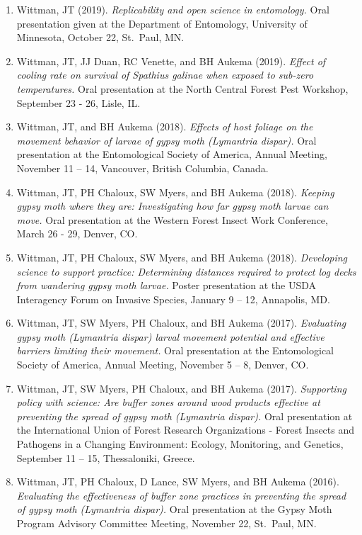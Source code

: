 \documentclass[11pt, a4paper]{awesome-cv}
\providecommand{\tightlist}{%
	\setlength{\itemsep}{0pt}\setlength{\parskip}{0pt}}
\begin{document}
\begin{enumerate}
\def\labelenumi{\arabic{enumi}.}
\tightlist
\item
  Wittman, JT (2019). \emph{Replicability and open science in entomology.} Oral presentation given at the Department of Entomology, University of Minnesota, October 22, St.~Paul, MN.
\item
  Wittman, JT, JJ Duan, RC Venette, and BH Aukema (2019). \emph{Effect of cooling rate on survival of Spathius galinae when exposed to sub-zero temperatures.} Oral presentation at the North Central Forest Pest Workshop, September 23 - 26, Lisle, IL.
\item
  Wittman, JT, and BH Aukema (2018). \emph{Effects of host foliage on the movement behavior of larvae of gypsy moth (Lymantria dispar).} Oral presentation at the Entomological Society of America, Annual Meeting, November 11 -- 14, Vancouver, British Columbia, Canada.
\item
  Wittman, JT, PH Chaloux, SW Myers, and BH Aukema (2018). \emph{Keeping gypsy moth where they are: Investigating how far gypsy moth larvae can move.} Oral presentation at the Western Forest Insect Work Conference, March 26 - 29, Denver, CO.
\item
  Wittman, JT, PH Chaloux, SW Myers, and BH Aukema (2018). \emph{Developing science to support practice: Determining distances required to protect log decks from wandering gypsy moth larvae.} Poster presentation at the USDA Interagency Forum on Invasive Species, January 9 -- 12, Annapolis, MD.
\item
  Wittman, JT, SW Myers, PH Chaloux, and BH Aukema (2017). \emph{Evaluating gypsy moth (Lymantria dispar) larval movement potential and effective barriers limiting their movement.} Oral presentation at the Entomological Society of America, Annual Meeting, November 5 -- 8, Denver, CO.
\item
  Wittman, JT, SW Myers, PH Chaloux, and BH Aukema (2017). \emph{Supporting policy with science: Are buffer zones around wood products effective at preventing the spread of gypsy moth (Lymantria dispar).} Oral presentation at the International Union of Forest Research Organizations - Forest Insects and Pathogens in a Changing Environment: Ecology, Monitoring, and Genetics, September 11 -- 15, Thessaloniki, Greece.
\item
  Wittman, JT, PH Chaloux, D Lance, SW Myers, and BH Aukema (2016). \emph{Evaluating the effectiveness of buffer zone practices in preventing the spread of gypsy moth (Lymantria dispar).} Oral presentation at the Gypsy Moth Program Advisory Committee Meeting, November 22, St.~Paul, MN.

\end{enumerate}
\end{document}
